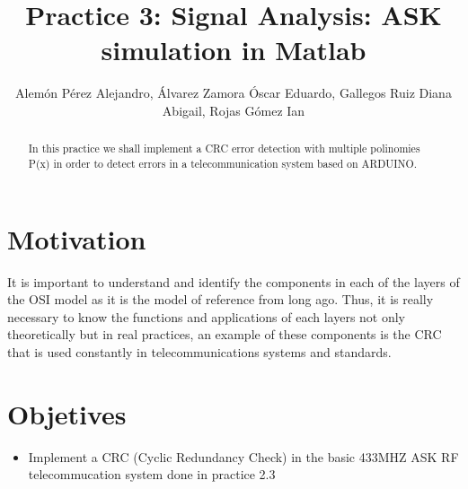 \documentclass{IEEEtran}
\title{Practice 3: Signal Analysis: ASK simulation in Matlab}
\author{Alemón Pérez Alejandro, Álvarez Zamora Óscar Eduardo, Gallegos Ruiz Diana Abigail, Rojas Gómez Ian }
\begin{document}
	
	\maketitle
	\begin{abstract}
	In this practice we shall implement a CRC error detection with multiple polinomies P(x) in order to detect errors in a telecommunication system based on ARDUINO.
	\end{abstract}
	\section{Motivation}	
		It is important to understand and identify the components in each of the layers of the OSI model as it is the model of reference from long ago. Thus, it is really necessary to know the functions and applications of each layers not only theoretically but in real practices, an example of these components is the CRC that is used constantly in telecommunications systems and standards.
	
	\section{Objetives}
		\begin{itemize}
			
			\item 	Implement a CRC (Cyclic Redundancy Check) in the basic 433MHZ ASK RF telecommucation system done in practice 2.3
			
		\end{itemize}

	
	
	
\end{document}
